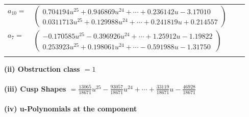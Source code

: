 \documentclass[1p]{elsarticle_modified}
\theoremstyle{definition}
\begin{document}
\begin{tabular}{m{7pt} m{180pt} m{7pt} m{180pt} }
\flushright $a_{10}=$&$\begin{pmatrix}0.704194 u^{25}+0.946869 u^{24}+\cdots+0.236142 u-3.17010\\0.0311713 u^{25}+0.129988 u^{24}+\cdots+0.241819 u+0.214557\end{pmatrix}$ \\
\flushright $a_{7}=$&$\begin{pmatrix}-0.170585 u^{25}-0.396926 u^{24}+\cdots+1.25912 u-1.19822\\0.253923 u^{25}+0.198061 u^{24}+\cdots-0.591988 u-1.31750\end{pmatrix}$\\&\end{tabular}
\flushleft \textbf{(ii) Obstruction class $= 1$}\\~\\
\flushleft \textbf{(iii) Cusp Shapes $= \frac{13065}{18671} u^{25}-\frac{93057}{18671} u^{24}+\cdots+\frac{33119}{18671} u-\frac{46928}{18671}$}\\~\\
\newpage\renewcommand{\arraystretch}{1}
\flushleft \textbf{(iv) u-Polynomials at the component}\newline \\
\end{document}
